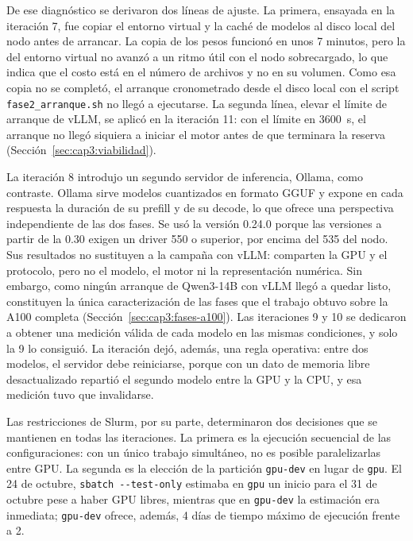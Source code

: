 De ese diagnóstico se derivaron dos líneas de ajuste. La primera, ensayada en la iteración 7, fue copiar el entorno virtual y la caché de modelos al disco local del nodo antes de arrancar. La copia de los pesos funcionó en unos 7 minutos, pero la del entorno virtual no avanzó a un ritmo útil con el nodo sobrecargado, lo que indica que el costo está en el número de archivos y no en su volumen. Como esa copia no se completó, el arranque cronometrado desde el disco local con el script \texttt{fase2\_arranque.sh} no llegó a ejecutarse. La segunda línea, elevar el límite de arranque de vLLM, se aplicó en la iteración 11: con el límite en 3600~s, el arranque no llegó siquiera a iniciar el motor antes de que terminara la reserva (Sección~\ref{sec:cap3:viabilidad}).

La iteración 8 introdujo un segundo servidor de inferencia, Ollama, como contraste. Ollama sirve modelos cuantizados en formato GGUF y expone en cada respuesta la duración de su prefill y de su decode, lo que ofrece una perspectiva independiente de las dos fases. Se usó la versión 0.24.0 porque las versiones a partir de la 0.30 exigen un driver 550 o superior, por encima del 535 del nodo. Sus resultados no sustituyen a la campaña con vLLM: comparten la GPU y el protocolo, pero no el modelo, el motor ni la representación numérica. Sin embargo, como ningún arranque de Qwen3-14B con vLLM llegó a quedar listo, constituyen la única caracterización de las fases que el trabajo obtuvo sobre la A100 completa (Sección~\ref{sec:cap3:fases-a100}). Las iteraciones 9 y 10 se dedicaron a obtener una medición válida de cada modelo en las mismas condiciones, y solo la 9 lo consiguió. La iteración dejó, además, una regla operativa: entre dos modelos, el servidor debe reiniciarse, porque con un dato de memoria libre desactualizado repartió el segundo modelo entre la GPU y la CPU, y esa medición tuvo que invalidarse.

Las restricciones de Slurm, por su parte, determinaron dos decisiones que se mantienen en todas las iteraciones. La primera es la ejecución secuencial de las configuraciones: con un único trabajo simultáneo, no es posible paralelizarlas entre GPU. La segunda es la elección de la partición \texttt{gpu-dev} en lugar de \texttt{gpu}. El 24 de octubre, \texttt{sbatch -{}-test-only} estimaba en \texttt{gpu} un inicio para el 31 de octubre pese a haber GPU libres, mientras que en \texttt{gpu-dev} la estimación era inmediata; \texttt{gpu-dev} ofrece, además, 4 días de tiempo máximo de ejecución frente a 2.

